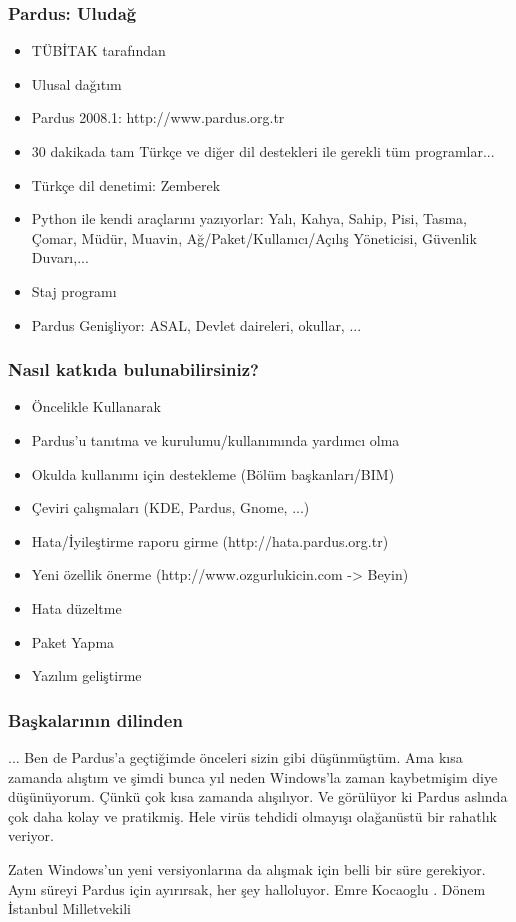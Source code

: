 \documentclass{beamer}
\begin{document}
	\begin{frame}
	 	\frametitle{Pardus: Uludağ}
		\begin{itemize}[<+->]
		 \item TÜBİTAK tarafından
		 \item Ulusal dağıtım
		 \item Pardus 2008.1: http://www.pardus.org.tr
		 \item 30 dakikada tam Türkçe ve diğer dil destekleri ile gerekli tüm programlar...
		 \item Türkçe dil denetimi: Zemberek
		 \item Python ile kendi araçlarını yazıyorlar: Yalı, Kahya, Sahip, Pisi, Tasma, Çomar, Müdür, Muavin, Ağ/Paket/Kullanıcı/Açılış Yöneticisi, Güvenlik Duvarı,...
		 \item Staj programı
		 \item Pardus Genişliyor: ASAL, Devlet daireleri, okullar, ...		 
		\end{itemize}

	\end{frame}
	\begin{frame}
	 \frametitle{Nasıl katkıda bulunabilirsiniz?}
		\begin{itemize}[<+->]
		 \item Öncelikle Kullanarak
		 \item Pardus'u tanıtma ve kurulumu/kullanımında yardımcı olma
		 \item Okulda kullanımı için destekleme (Bölüm başkanları/BIM)
		 \item Çeviri çalışmaları (KDE, Pardus, Gnome, ...)
		 \item Hata/İyileştirme raporu girme (http://hata.pardus.org.tr)
		 \item Yeni özellik önerme (http://www.ozgurlukicin.com -> Beyin)
		 \item Hata düzeltme
		 \item Paket Yapma
		 \item Yazılım geliştirme
		\end{itemize}

	\end{frame}

	\begin{frame}
	\frametitle{Başkalarının dilinden}
	... Ben de Pardus'a geçtiğimde önceleri sizin gibi
	düşünmüştüm. Ama kısa zamanda alıştım ve şimdi bunca yıl neden Windows'la
	zaman kaybetmişim diye düşünüyorum. Çünkü çok kısa zamanda alışılıyor. Ve
	görülüyor ki Pardus aslında çok daha kolay ve pratikmiş. Hele virüs tehdidi
	olmayışı olağanüstü bir rahatlık veriyor.
	
	Zaten Windows'un yeni versiyonlarına da alışmak için belli bir süre gerekiyor.
	Aynı süreyi Pardus için ayırırsak, her şey halloluyor.
	\newline
	\newline
	Emre Kocaoglu
	. Dönem İstanbul Milletvekili
	\end{frame}
	
\end{document}
